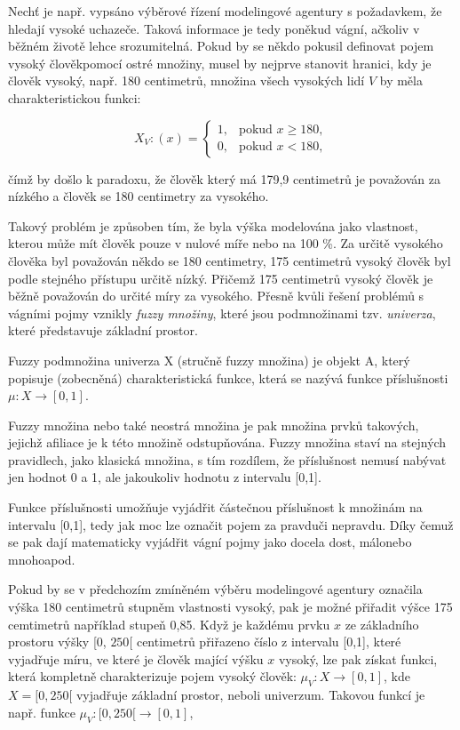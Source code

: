Nech\v t je např. vypsáno výběrové řízení modelingové agentury s požadavkem, že hledají vysoké uchazeče. Taková informace je tedy poněkud vágní, ačkoliv v běžném životě lehce srozumitelná. Pokud by se někdo pokusil definovat pojem \clqq vysoký člověk\crqq \space pomocí ostré množiny, musel by nejprve stanovit hranici, kdy je člověk vysoký, např. 180 centimetr\r u, množina všech vysokých lidí $V$ by měla charakteristickou funkci:

    $$X_V:(x)=\begin{cases} 1, & \mbox{pokud }  x \geq 180,\\    0, & \mbox{pokud } x < 180,  \end{cases}$$

    čímž by došlo k paradoxu, že člověk který má 179,9 centimetr\r u je považován za nízkého a člověk se 180 centimetry za vysokého.

    Takový problém je zp\r usoben tím, že byla výška modelována jako vlastnost, kterou m\r uže mít člověk pouze v nulové míře nebo na 100 \%. Za určitě vysokého člověka byl považován někdo se 180 centimetry, 175 centimetr\r u vysoký člověk byl podle stejného přístupu určitě n\'izk\'y. Přičemž 175 centimetr\r u vysoký člověk je běžně považován do určité míry za vysokého. Přesně kvůli řešení problémů s vágními pojmy vznikly \textit{fuzzy množiny}, které jsou podmno\v zinami tzv. \textit{univerza}, které p\v redstavuje základní prostor. 
    
    \begin{definition}
    \cite{navara}
        Fuzzy podmnožina univerza X (stručně fuzzy množina) je objekt A, který popisuje (zobecněná) charakteristická funkce, která se nazývá funkce příslušnosti $\mu: X \rightarrow [0,1]$. 
    \end{definition}
    
    Fuzzy množina nebo také neostrá množina je pak množina prvků takových, jejichž afiliace je k této množině odstupňována. Fuzzy množina staví na stejných pravidlech, jako klasická množina, s tím rozdílem, že příslušnost nemusí nabývat jen hodnot 0 a 1, ale jakoukoliv hodnotu z intervalu [0,1]. 
   
    Funkce příslušnosti umož\v nuje vyjádřit částečnou příslušnost k množinám na intervalu [0,1], tedy jak moc lze označit pojem za \clqq pravdu\crqq \space či \clqq nepravdu\crqq. Díky čemuž se pak dají matematicky vyjádřit vágní pojmy jako \clqq docela dost\crqq, \clqq málo\crqq \space nebo \clqq mnoho\crqq \space apod.

     Pokud by se v předchozím zmíněném výběru modelingové agentury označila výška 180 centimetr\r u stupněm vlastnosti \clqq vysoký\crqq {}, pak je možné přiřadit výšce 175 cemtimetr\r u například stupe\v n 0,85. Když je každému prvku $x$ ze základního prostoru výšky [0, $250$[ centimetr\r u přiřazeno číslo z intervalu [0,1], které vyjadřuje míru, ve které je člověk mající výšku $x$ vysoký, lze pak získat funkci, která kompletně charakterizuje pojem vysoký člověk: $\mu_V: X \to [0,1]$, kde $X = [0, 250[$ vyjadřuje základní prostor, neboli univerzum. Takovou funkcí je např. funkce $\mu_V:  [0, 250[ \rightarrow [0,1]$, 

